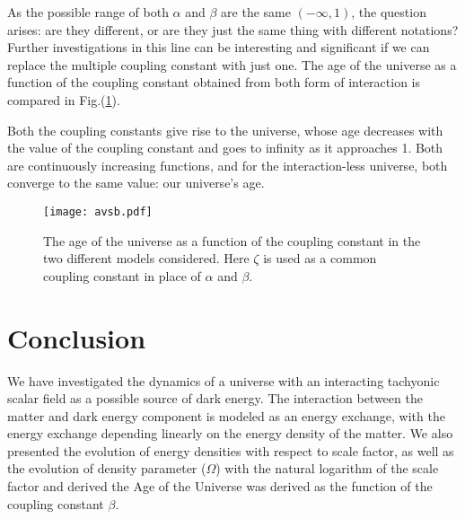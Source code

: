 \documentclass[preprint,aps,floatfix]{revtex4}
\begin{document}
As the possible range of both $\alpha$ and $\beta$ are the same $(-\infty,1)$, the question arises: are they different, or are they just the same thing with different notations? Further investigations in this line can be interesting and significant if we can replace the multiple coupling constant with just one. The age of the universe as a function of the coupling constant obtained
from both form of interaction is compared in Fig.(\ref{fig:comparision}). 

Both the coupling constants give rise to the universe, whose age decreases with the value of the coupling constant and goes to infinity as it approaches 1. Both are continuously increasing functions, and for the interaction-less universe, both converge to the same value: our universe's age.

\begin{figure}[h]
    \centering
    \texttt{[image: avsb.pdf]}
    \caption{The age of the universe as a function of the coupling constant in the two different models considered. Here $\zeta$ is used as a common coupling constant in place of $\alpha$ and $\beta$.}
    \label{fig:comparision}
\end{figure}





    \section{Conclusion}\label{sec: Con}
    \noindent
%
   We have investigated the dynamics of a universe with an interacting tachyonic scalar field as a possible source of dark energy. The interaction between the matter and dark energy component is modeled as an energy exchange, with the energy exchange depending linearly on the energy density of the matter.
%
    We also presented the evolution of energy densities with respect to scale factor, as well as the evolution of density parameter ($\Omega$) with the natural logarithm of the scale factor and derived the Age of the Universe was derived as the function of the coupling constant $\beta$.
\end{document}
